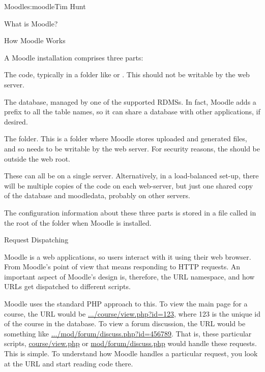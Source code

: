 \begin{aosachapter}{Moodle}{s:moodle}{Tim Hunt}
\begin{aosasect1}{What is Moodle?}
\end{aosasect1}

\begin{aosasect1}{How Moodle Works}

A Moodle installation comprises three parts:

\begin{aosaenumerate}

\item The code, typically in a folder like  or
  . This should not be writable
  by the web server.

\item The database, managed by one of the supported RDMSs. In fact,
  Moodle adds a prefix to all the table names, so it can share a
  database with other applications, if desired.

\item The  folder. This is a folder where Moodle
  stores uploaded and generated files, and so needs to be writable by
  the web server. For security reasons, the should be outside the web
  root.

\end{aosaenumerate}

These can all be on a single server. Alternatively, in a load-balanced
set-up, there will be multiple copies of the code on each web-server,
but just one shared copy of the database and moodledata, probably on
other servers.

The configuration information about these three parts is stored in a
file called  in the root of the  folder
when Moodle is installed.

\begin{aosasect2}{Request Dispatching}

Moodle is a web applications, so users interact with it using their
web browser. From Moodle's point of view that means responding to HTTP
requests. An important aspect of Moodle's design is, therefore, the
URL namespace, and how URLs get dispatched to different scripts.

Moodle uses the standard PHP approach to this. To view the main page
for a course, the URL would be \url{.../course/view.php?id=123}, where
123 is the unique id of the course in the database. To view a forum
discussion, the URL would be something like
\url{.../mod/forum/discuss.php?id=456789}. That is, these particular
scripts, \url{course/view.php} or \url{mod/forum/discuss.php} would
handle these requests. This is simple. To understand how Moodle
handles a particular request, you look at the URL and start reading
code there.


\end{aosasect2}
\end{aosasect1}
\end{aosachapter}
